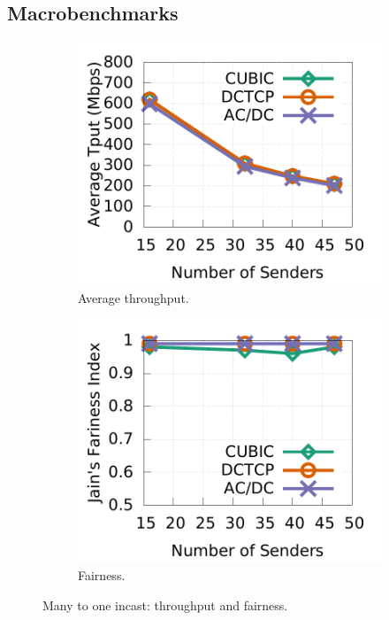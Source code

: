 \subsection{Macrobenchmarks}
\label{macro}

\begin{figure}[!t]
        \centering
        \begin{subfigure}[b]{0.45\textwidth}
                \centering
                \includegraphics[width=\textwidth]{acdctcp/figures/incast/plots9k/incast_tput_vary_sender.pdf}
                \caption{Average throughput.}
                \label{incast_9k_tput}
        \end{subfigure}
        \begin{subfigure}[b]{0.45\textwidth}
                \centering
                \includegraphics[width=\textwidth]{acdctcp/figures/incast/plots9k/incast_fairness_vary_sender.pdf}
                \caption{Fairness.}
                \label{incast_9k_fariness}
        \end{subfigure}
        \caption{Many to one incast: throughput and fairness.}
        \label{incast_9k_tput_fairness}
\end{figure}

